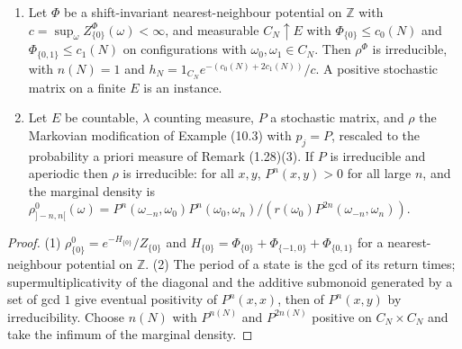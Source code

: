 \begin{example}[Georgii (10.24)]
    \label{ex:mfu-10-24}
    \leanok

    \begin{enumerate}
    \item Let $\Phi$ be a shift-invariant nearest-neighbour potential on $\mathbb Z$ with
      $c = \sup_\omega Z^\Phi_{\{0\}}(\omega) < \infty$, and measurable $C_N \uparrow E$ with
      $\Phi_{\{0\}} \leq c_0(N)$ and $\Phi_{\{0,1\}} \leq c_1(N)$ on configurations with
      $\omega_0, \omega_1 \in C_N$. Then $\rho^\Phi$ is irreducible, with $n(N) = 1$ and
      $h_N = 1_{C_N} e^{-(c_0(N) + 2c_1(N))}/c$. A positive stochastic matrix on a finite $E$
      is an instance.
    \item Let $E$ be countable, $\lambda$ counting measure, $P$ a stochastic matrix, and
      $\rho$ the Markovian modification of Example (10.3) with $p_j = P$, rescaled to the
      probability a priori measure of Remark (1.28)(3). If $P$ is irreducible and aperiodic
      then $\rho$ is irreducible: for all $x, y$, $P^n(x,y) > 0$ for all large $n$, and the
      marginal density is $\rho^0_{]-n,n[}(\omega) = P^n(\omega_{-n},\omega_0)
      P^n(\omega_0,\omega_n)/(r(\omega_0) P^{2n}(\omega_{-n},\omega_n))$.
    \end{enumerate}
\end{example}
\begin{proof}
    \leanok
    (1) $\rho^0_{\{0\}} = e^{-H_{\{0\}}}/Z_{\{0\}}$ and $H_{\{0\}} = \Phi_{\{0\}} +
    \Phi_{\{-1,0\}} + \Phi_{\{0,1\}}$ for a nearest-neighbour potential on $\mathbb Z$.
    (2) The period of a state is the gcd of its return times; supermultiplicativity of the
    diagonal and the additive submonoid generated by a set of gcd $1$ give eventual positivity
    of $P^n(x,x)$, then of $P^n(x,y)$ by irreducibility. Choose $n(N)$ with $P^{n(N)}$ and
    $P^{2n(N)}$ positive on $C_N \times C_N$ and take the infimum of the marginal density.
\end{proof}

